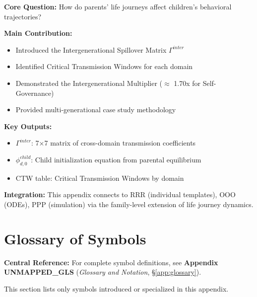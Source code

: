 \begin{tcolorbox}[colback=green!10!white, colframe=green!75!black,
    title=\textbf{Appendix UNMAPPED_COR: Summary}]

\textbf{Core Question:} How do parents' life journeys affect children's behavioral trajectories?

\textbf{Main Contribution:}
\begin{itemize}[nosep]
    \item Introduced the Intergenerational Spillover Matrix $\Gamma^{inter}$
    \item Identified Critical Transmission Windows for each domain
    \item Demonstrated the Intergenerational Multiplier ($\approx$ 1.70x for Self-Governance)
    \item Provided multi-generational case study methodology
\end{itemize}

\textbf{Key Outputs:}
\begin{itemize}[nosep]
    \item $\Gamma^{inter}$: 7×7 matrix of cross-domain transmission coefficients
    \item $\phi^{child}_{d,0}$: Child initialization equation from parental equilibrium
    \item CTW table: Critical Transmission Windows by domain
\end{itemize}

\textbf{Integration:} This appendix connects to RRR (individual templates), OOO (ODEs),
PPP (simulation) via the family-level extension of life journey dynamics.

\end{tcolorbox}


\section{Glossary of Symbols}
\label{sec:BI-glossary}

\begin{tcolorbox}[colback=blue!5!white, colframe=blue!75!black]
\textbf{Central Reference:} For complete symbol definitions, see
\textbf{Appendix UNMAPPED_GLS} (\textit{Glossary and Notation}, \S\ref{app:glossary}).

This section lists only symbols introduced or specialized in this appendix.
\end{tcolorbox}

